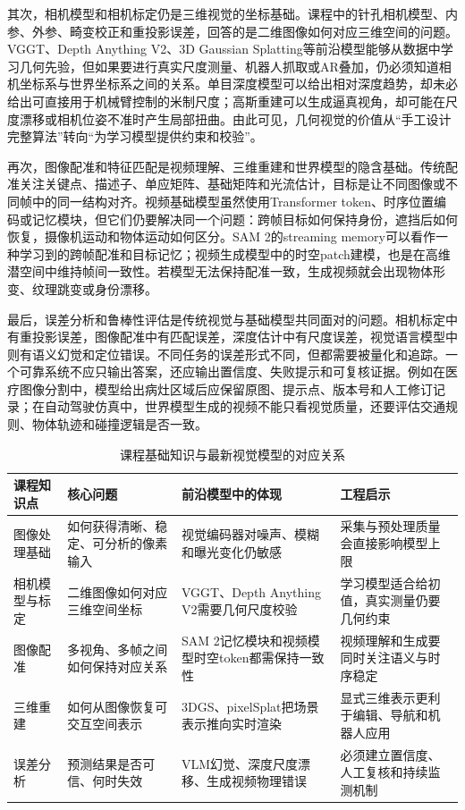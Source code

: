 \documentclass[UTF8,a4paper,12pt]{ctexart}
\newcommand{\model}[1]{\textsf{#1}}
\begin{document}
其次，相机模型和相机标定仍是三维视觉的坐标基础。课程中的针孔相机模型、内参、外参、畸变校正和重投影误差，回答的是二维图像如何对应三维空间的问题。\model{VGGT}、\model{Depth Anything V2}、\model{3D Gaussian Splatting}等前沿模型能够从数据中学习几何先验，但如果要进行真实尺度测量、机器人抓取或AR叠加，仍必须知道相机坐标系与世界坐标系之间的关系。单目深度模型可以给出相对深度趋势，却未必给出可直接用于机械臂控制的米制尺度；高斯重建可以生成逼真视角，却可能在尺度漂移或相机位姿不准时产生局部扭曲。由此可见，几何视觉的价值从“手工设计完整算法”转向“为学习模型提供约束和校验”。

再次，图像配准和特征匹配是视频理解、三维重建和世界模型的隐含基础。传统配准关注关键点、描述子、单应矩阵、基础矩阵和光流估计，目标是让不同图像或不同帧中的同一结构对齐。视频基础模型虽然使用Transformer token、时序位置编码或记忆模块，但它们仍要解决同一个问题：跨帧目标如何保持身份，遮挡后如何恢复，摄像机运动和物体运动如何区分。\model{SAM 2}的streaming memory可以看作一种学习到的跨帧配准和目标记忆；视频生成模型中的时空patch建模，也是在高维潜空间中维持帧间一致性。若模型无法保持配准一致，生成视频就会出现物体形变、纹理跳变或身份漂移。

最后，误差分析和鲁棒性评估是传统视觉与基础模型共同面对的问题。相机标定中有重投影误差，图像配准中有匹配误差，深度估计中有尺度误差，视觉语言模型中则有语义幻觉和定位错误。不同任务的误差形式不同，但都需要被量化和追踪。一个可靠系统不应只输出答案，还应输出置信度、失败提示和可复核证据。例如在医疗图像分割中，模型给出病灶区域后应保留原图、提示点、版本号和人工修订记录；在自动驾驶仿真中，世界模型生成的视频不能只看视觉质量，还要评估交通规则、物体轨迹和碰撞逻辑是否一致。

\begin{table}[htbp]
\centering
\small
\caption{课程基础知识与最新视觉模型的对应关系}
\begin{tabularx}{\textwidth}{C{2.5cm}Y Y Y}
\toprule
\textbf{课程知识点} & \textbf{核心问题} & \textbf{前沿模型中的体现} & \textbf{工程启示} \\
\midrule
图像处理基础 & 如何获得清晰、稳定、可分析的像素输入 & 视觉编码器对噪声、模糊和曝光变化仍敏感 & 采集与预处理质量会直接影响模型上限 \\
相机模型与标定 & 二维图像如何对应三维空间坐标 & \model{VGGT}、\model{Depth Anything V2}需要几何尺度校验 & 学习模型适合给初值，真实测量仍要几何约束 \\
图像配准 & 多视角、多帧之间如何保持对应关系 & \model{SAM 2}记忆模块和视频模型时空token都需保持一致性 & 视频理解和生成要同时关注语义与时序稳定 \\
三维重建 & 如何从图像恢复可交互空间表示 & \model{3DGS}、\model{pixelSplat}把场景表示推向实时渲染 & 显式三维表示更利于编辑、导航和机器人应用 \\
误差分析 & 预测结果是否可信、何时失效 & VLM幻觉、深度尺度漂移、生成视频物理错误 & 必须建立置信度、人工复核和持续监测机制 \\
\bottomrule
\end{tabularx}
\end{table}
\end{document}
